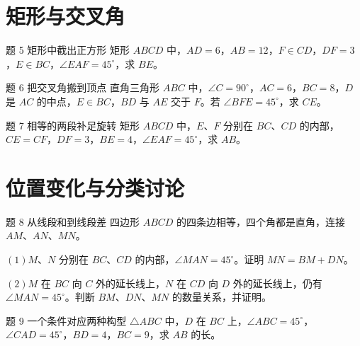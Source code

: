 \section{矩形与交叉角}
\noindent\begin{minipage}{\linewidth}
\begin{problem}{题 5 矩形中截出正方形}
矩形 \(ABCD\) 中，\(AD=6\)，\(AB=12\)，\(F\in CD\)，\(DF=3\)，\(E\in BC\)，\(\angle EAF=45^\circ \)，求 \(BE\)。
\diagram{\figSix}
\end{problem}

\begin{problem}{题 6 把交叉角搬到顶点}
直角三角形 \(ABC\) 中，\(\angle C=90^\circ \)，\(AC=6\)，\(BC=8\)，\(D\) 是 \(AC\) 的中点，\(E\in BC\)，\(BD\) 与 \(AE\) 交于 \(F\)。若 \(\angle BFE=45^\circ \)，求 \(CE\)。
\diagram{\figSeven}
\end{problem}
\begin{problem}{题 7 相等的两段补足旋转}
矩形 \(ABCD\) 中，\(E\)、\(F\) 分别在 \(BC\)、\(CD\) 的内部，\(CE=CF\)，\(DF=3\)，\(BE=4\)，\(\angle EAF=45^\circ \)，求 \(AB\)。
\diagram{\figEight}
\end{problem}
\end{minipage}
\clearpage
\section{位置变化与分类讨论}
\begin{problem}{题 8 从线段和到线段差}
四边形 \(ABCD\) 的四条边相等，四个角都是直角，连接 \(AM\)、\(AN\)、\(MN\)。

\((1)M\)、\(N\) 分别在 \(BC\)、\(CD\) 的内部，\(\angle MAN=45^\circ \)。证明 \(MN=BM+DN\)。

\((2)M\) 在 \(BC\) 向 \(C\) 外的延长线上，\(N\) 在 \(CD\) 向 \(D\) 外的延长线上，仍有 \(\angle MAN=45^\circ \)。判断 \(BM\)、\(DN\)、\(MN\) 的数量关系，并证明。
\diagram{\figNine}
\end{problem}
\begin{problem}{题 9 一个条件对应两种构型}
\(\triangle ABC\) 中，\(D\) 在 \(BC\) 上，\(\angle ABC=45^\circ \)，\(\angle CAD=45^\circ \)，\(BD=4\)，\(BC=9\)，求 \(AB\) 的长。
\diagram{\figTen}
\end{problem}
